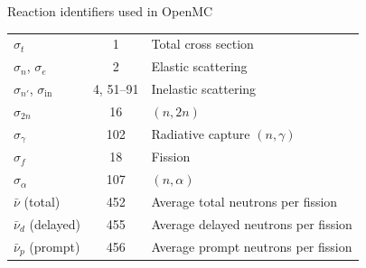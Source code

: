 \begin{handoutcolumns}
\begin{fixedbox}{Reaction identifiers used in OpenMC}
\scriptsize
\begin{tabularx}{\linewidth}{@{}l c X@{}}
\toprule
$\sigma_{t}$            & 1        & Total cross section \\
$\sigma_{n}$, $\sigma_{e}$ & 2        & Elastic scattering \\
$\sigma_{n'}$, $\sigma_{\mathrm{in}}$ & 4, 51--91 & Inelastic scattering \\
$\sigma_{2n}$           & 16       & $(n,2n)$  \\
$\sigma_{\gamma}$       & 102      & Radiative capture $(n,\gamma)$ \\
$\sigma_{f}$            & 18       & Fission \\
$\sigma_{\alpha}$       & 107      & $(n,\alpha)$ \\
\midrule
$\bar{\nu}$ (total)     & 452      & Average total neutrons per fission \\
$\bar{\nu}_{d}$ (delayed) & 455    & Average delayed neutrons per fission \\
$\bar{\nu}_{p}$ (prompt)  & 456    & Average prompt neutrons per fission \\
\bottomrule
\end{tabularx}
\normalsize
\end{fixedbox}

\end{handoutcolumns}

